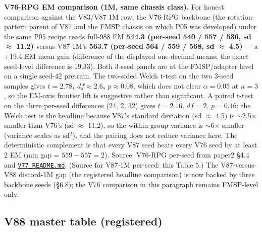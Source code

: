 \documentclass[11pt]{article}
\begin{document}
\textbf{V76-RPG EM comparison (1M, same chassis class).} For honest comparison against the V83/V87 1M row, the V76-RPG backbone (the rotation-pattern parent of V87 and the FMSP chassis on which P05 was developed) under the same P05 recipe reads full-988 EM \textbf{544.3 (per-seed 540 / 557 / 536, sd $\approx$ 11.2)} versus V87-1M's \textbf{563.7 (per-seed 564 / 559 / 568, sd $\approx$ 4.5)} --- a +19.4 EM mean gain (difference of the displayed one-decimal means; the exact seed-level difference is 19.33). Both 3-seed panels are at the FMSP/adapter level on a single seed-42 pretrain. The two-sided Welch t-test on the two 3-seed samples gives \textbf{$t = 2.78$, $df \approx 2.6$, $p \approx 0.08$}, which does not clear $\alpha = 0.05$ at $n = 3$, so the EM-axis frontier lift is suggestive rather than significant. A paired t-test on the three per-seed differences (24, 2, 32) gives $t = 2.16$, $df = 2$, $p = 0.16$; the Welch test is the headline because V87's standard deviation (sd $\approx$ 4.5) is $\sim$2.5$\times$ smaller than V76's (sd $\approx$ 11.2), so the within-group variance is $\sim$6$\times$ smaller (variance scales as sd$^2$), and the pairing does not reduce variance here. The deterministic complement is that every V87 seed beats every V76 seed by at least 2 EM (min gap = $559 - 557 = 2$). Source: V76-RPG per-seed from paper2 \S4.4 and \href{https://github.com/llaa33219/MicroMixer-4/blob/4bb630413dfa58ef3141291e121ab8c006d03235/V77_README.md}{\texttt{V77\_README.md}}. (Source for V87-1M per-seed: this Table 5.) The V87-versus-V88 discord-1M gap (the registered headline comparison) is now backed by three backbone seeds (\S6.8); the V76 comparison in this paragraph remains FMSP-level only.

\subsection{V88 master table (registered)}
\end{document}
